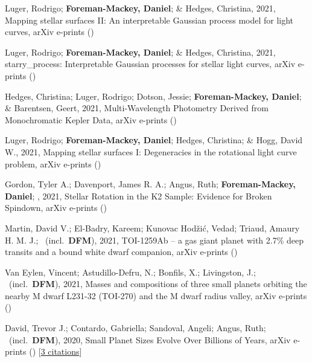 \item[{\color{numcolor}\scriptsize12}] Luger, Rodrigo; \textbf{Foreman-Mackey, Daniel}; \& Hedges, Christina, 2021, Mapping stellar surfaces II: An interpretable Gaussian process model for light curves, arXiv e-prints ()

\item[{\color{numcolor}\scriptsize11}] Luger, Rodrigo; \textbf{Foreman-Mackey, Daniel}; \& Hedges, Christina, 2021, starry{\_}process: Interpretable Gaussian processes for stellar light curves, arXiv e-prints ()

\item[{\color{numcolor}\scriptsize10}] Hedges, Christina; Luger, Rodrigo; Dotson, Jessie; \textbf{Foreman-Mackey, Daniel}; \& Barentsen, Geert, 2021, Multi-Wavelength Photometry Derived from Monochromatic Kepler Data, arXiv e-prints ()

\item[{\color{numcolor}\scriptsize9}] Luger, Rodrigo; \textbf{Foreman-Mackey, Daniel}; Hedges, Christina; \& Hogg, David W., 2021, Mapping stellar surfaces I: Degeneracies in the rotational light curve problem, arXiv e-prints ()

\item[{\color{numcolor}\scriptsize8}] Gordon, Tyler A.; Davenport, James R. A.; Angus, Ruth; \textbf{Foreman-Mackey, Daniel}; \etal, 2021, Stellar Rotation in the K2 Sample: Evidence for Broken Spindown, arXiv e-prints ()

\item[{\color{numcolor}\scriptsize7}] Martin, David V.; El-Badry, Kareem; Kunovac Hod{\v{z}}i{\'c}, Vedad; Triaud, Amaury H. M. J.; \etal\ (incl.\ \textbf{DFM}), 2021, TOI-1259Ab -- a gas giant planet with 2.7{\%} deep transits and a bound white dwarf companion, arXiv e-prints ()

\item[{\color{numcolor}\scriptsize6}] Van Eylen, Vincent; Astudillo-Defru, N.; Bonfils, X.; Livingston, J.; \etal\ (incl.\ \textbf{DFM}), 2021, Masses and compositions of three small planets orbiting the nearby M dwarf L231-32 (TOI-270) and the M dwarf radius valley, arXiv e-prints ()

\item[{\color{numcolor}\scriptsize5}] David, Trevor J.; Contardo, Gabriella; Sandoval, Angeli; Angus, Ruth; \etal\ (incl.\ \textbf{DFM}), 2020, Small Planet Sizes Evolve Over Billions of Years, arXiv e-prints () [\href{https://ui.adsabs.harvard.edu/abs/2020arXiv201109894D}{3 citations}]


